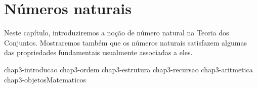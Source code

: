 \chapter{Números naturais}\label{chap:numerosNaturais}
Neste capítulo, introduziremos a noção de número natural na Teoria dos Conjuntos.
Mostraremos também que os números naturais satisfazem algumas das propriedades fundamentais usualmente associadas a eles.

{chap3-introducao}
{chap3-ordem}
{chap3-estrutura}
{chap3-recursao}
{chap3-aritmetica}
{chap3-objetosMatematicos}
